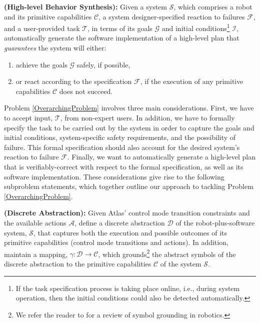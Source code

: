 
\begin{myProblem}\label{OverarchingProblem}
\textbf{(High-level Behavior Synthesis):}
	Given a system $\mathcal{S}$, which comprises a robot and its primitive capabilities $\mathcal{C}$, a system designer-specified reaction to failures $\mathcal{F}$, and a user-provided task $\mathcal{T}$, in terms of its goals $\mathcal{G}$ and initial conditions\footnote{If the task specification process is taking place online, i.e., during system operation, then the initial conditions could also be detected automatically.}
	 $\mathcal{I}$, automatically generate the software implementation of a high-level plan that \emph{guarantees} the system will either:
	\begin{enumerate}[i]
		\item achieve the goals $\mathcal{G}$ safely, if possible,
		\item or react according to the specification $\mathcal{F}$, if the execution of any primitive capabilities $\mathcal{C}$ does not succeed.
	\end{enumerate}
\end{myProblem}

Problem \ref{OverarchingProblem} involves three main considerations.
First, we have to accept input, $\mathcal{T}$, from non-expert users.
In addition, we have to formally specify the task to be carried out by the system in order to capture the goals and initial conditions, system-specific safety requirements, and the possibility of failure.
This formal specification should also account for the desired system's reaction to failure $\mathcal{F}$.
Finally, we want to automatically generate a high-level plan that is verifiably-correct with respect to the formal specification, as well as its software implementation.
These considerations give rise to the following subproblem statements, which together outline our approach to tackling Problem \ref{OverarchingProblem}.

\begin{myProblem}\label{DiscreteAbstractionProblem}
\textbf{(Discrete Abstraction):}
Given Atlas' control mode transition constraints and the available actions $\mathcal{A}$, define a discrete abstraction $\mathcal{D}$ of the robot-plus-software system, $\mathcal{S}$, that captures both the execution and possible outcomes of its primitive capabilities (control mode transitions and actions).
In addition, maintain a mapping, $\gamma: \mathcal{D} \rightarrow \mathcal{C}$, which grounds\footnote{We refer the reader to \cite{Grounding2013} for a review of symbol grounding in robotics.}
 the abstract symbols of the discrete abstraction to the primitive capabilities $\mathcal{C}$ of the system $\mathcal{S}$.
\end{myProblem}

